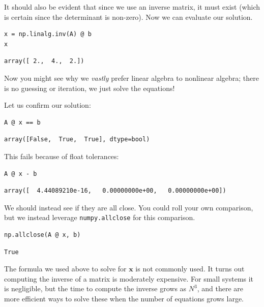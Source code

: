 \documentclass[11pt]{article}
\begin{document}
It should also be evident that since we use an inverse matrix, it must exist (which is certain since the determinant is non-zero). Now we can evaluate our solution.

\begin{verbatim}
x = np.linalg.inv(A) @ b
x
\end{verbatim}

\begin{verbatim}
array([ 2.,  4.,  2.])
\end{verbatim}

Now you might see why we \emph{vastly} prefer linear algebra to nonlinear algebra; there is no guessing or iteration, we just solve the equations!

Let us confirm our solution:

\begin{verbatim}
A @ x == b
\end{verbatim}

\begin{verbatim}
array([False,  True,  True], dtype=bool)
\end{verbatim}

This fails because of float tolerances:

\begin{verbatim}
A @ x - b
\end{verbatim}

\begin{verbatim}
array([  4.44089210e-16,   0.00000000e+00,   0.00000000e+00])
\end{verbatim}

We should instead see if they are all close. You could roll your own comparison, but we instead leverage \texttt{numpy.allclose} for this comparison.

\begin{verbatim}
np.allclose(A @ x, b)
\end{verbatim}

\begin{verbatim}
True
\end{verbatim}

The formula we used above to solve for \(\mathbf{x}\) is not commonly used. It turns out computing the inverse of a matrix is moderately expensive. For small systems it is negligible, but the time to compute the inverse grows as \(N^3\), and there are more efficient ways to solve these when the number of equations grows large.
\end{document}
